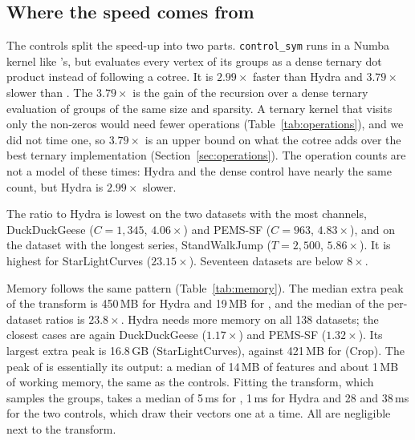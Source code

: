\subsection{Where the speed comes from}

The controls split the speed-up into two parts. \texttt{control\_sym} runs in a Numba
kernel like \hh{}'s, but evaluates every vertex of its groups as a dense ternary dot
product instead of following a cotree. It is $2.99\times$ faster than Hydra and $3.79\times$
slower than \hh{}. The $3.79\times$ is the gain of the recursion over a dense ternary
evaluation of groups of the same size and sparsity. A ternary kernel that visits only the
non-zeros would need fewer operations (Table~\ref{tab:operations}), and we did not time
one, so $3.79\times$ is an upper bound on what the cotree adds over the best ternary
implementation (Section~\ref{sec:operations}). The operation counts are not a model of
these times: Hydra and the dense control have nearly the same count, but Hydra is
$2.99\times$ slower.

The ratio to Hydra is lowest on the two datasets with the most channels, DuckDuckGeese
($C=1{,}345$, $4.06\times$) and PEMS-SF ($C=963$, $4.83\times$), and on the dataset with
the longest series, StandWalkJump ($T=2{,}500$, $5.86\times$). It is highest for StarLightCurves
($23.15\times$). Seventeen datasets are below $8\times$.

\begin{table}[t]
\centering\small

\caption{Extra peak memory of the transform: the rise in peak resident set size during
\texttt{transform} of the test set, after \texttt{fit} and a warm-up, each measured in a
fresh process. It includes the output array.}
\label{tab:memory}
\end{table}

Memory follows the same pattern (Table~\ref{tab:memory}). The median extra peak of the
transform is 450\,MB for Hydra and 19\,MB for \hh{}, and the median of the per-dataset
ratios is $23.8\times$. Hydra needs more memory on all 138 datasets; the closest cases are
again DuckDuckGeese ($1.17\times$) and PEMS-SF ($1.32\times$). Its largest extra peak
is 16.8\,GB (StarLightCurves), against 421\,MB for \hh{} (Crop). The peak of \hh{} is
essentially its output: a median of 14\,MB of features and about 1\,MB of working memory,
the same as the controls. Fitting the transform, which samples the groups, takes a median
of 5\,ms for \hh{}, 1\,ms for Hydra and 28 and 38\,ms for the two controls, which draw
their vectors one at a time. All are negligible next to the transform.

